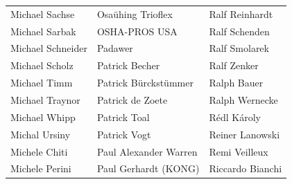 \begin{small}
\begin{tabular}{p{4cm}p{4cm}p{4cm}}
\\Michael Sachse & Osaühing Trioflex & Ralf Reinhardt \\Michael Sarbak & OSHA-PROS USA & Ralf Schenden \\Michael Schneider & Padawer & Ralf Smolarek \\Michael Scholz & Patrick Becher & Ralf Zenker \\Michael Timm & Patrick Bürckstümmer & Ralph Bauer \\Michael Traynor & Patrick de Zoete & Ralph Wernecke \\Michael Whipp & Patrick Toal & Rédl Károly \\Michal Ursiny & Patrick Vogt & Reiner Lanowski \\Michele Chiti & Paul Alexander Warren & Remi Veilleux \\Michele Perini & Paul Gerhardt (KONG) & Riccardo Bianchi \\
\end{tabular}
\newpage
\setlength{\tabcolsep}{1mm}
\begin{tabular}{p{4cm}p{4cm}p{4cm}}

\end{tabular}
\end{small}
